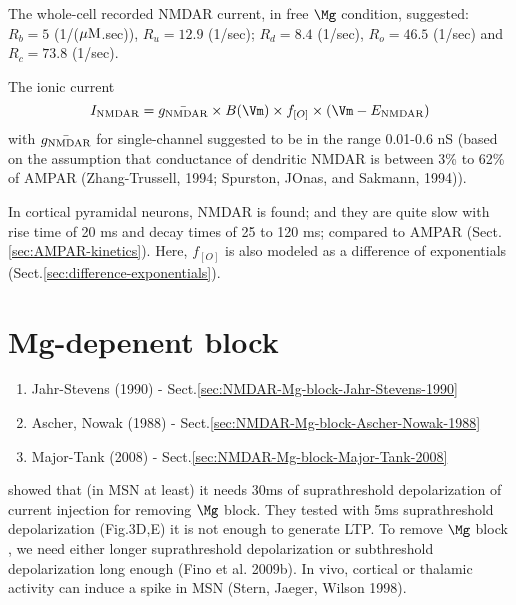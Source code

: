 The whole-cell recorded NMDAR current, in free $\Mg$ condition, suggested:
$R_b = 5$ (1/(${\mu\text{M}}$.sec)), $R_u = 12.9$ (1/sec); $R_d = 8.4$ (1/sec), 
$R_o = 46.5$ (1/sec) and $R_c = 73.8$ (1/sec).

The ionic current
\begin{equation}
I_\NMDA = \bar{g_\NMDA} \times B(\Vm) \times f_{[O]} \times (\Vm - E_\NMDA)
\end{equation}
with $\bar{g_{\text{NMDAR}}}$ for single-channel suggested to be in the 
range 0.01-0.6 nS (based on the assumption that conductance of dendritic NMDAR
is between 3\% to 62\% of AMPAR (Zhang-Trussell, 1994; Spurston, JOnas, and
Sakmann, 1994)).


In cortical pyramidal neurons, NMDAR is found; and they are quite slow with rise
time of 20 ms  and  decay  times  of 25 to 120 ms; compared to AMPAR
(Sect.\ref{sec:AMPAR-kinetics}). Here, $f_{[O]}$ is also modeled as a difference
of exponentials (Sect.\ref{sec:difference-exponentials}).



\section{Mg-depenent block}
\label{sec:NMDAR-Mg-block}

\begin{enumerate}
  \item Jahr-Stevens (1990) - Sect.\ref{sec:NMDAR-Mg-block-Jahr-Stevens-1990}
  
  \item Ascher, Nowak (1988) - Sect.\ref{sec:NMDAR-Mg-block-Ascher-Nowak-1988}
  
  \item Major-Tank (2008) - Sect.\ref{sec:NMDAR-Mg-block-Major-Tank-2008}
\end{enumerate}

\citep{fino2010} showed that (in MSN at least) it needs 30ms of suprathreshold
depolarization of current injection for removing $\Mg$ block.
They tested with 5ms suprathreshold depolarization (Fig.3D,E) it is not enough
to generate LTP. To remove $\Mg$ block , we need either longer suprathreshold
depolarization or subthreshold depolarization long  enough (Fino et al.
2009b). In vivo, cortical or thalamic activity can induce a spike in MSN (Stern,
Jaeger, Wilson 1998).


